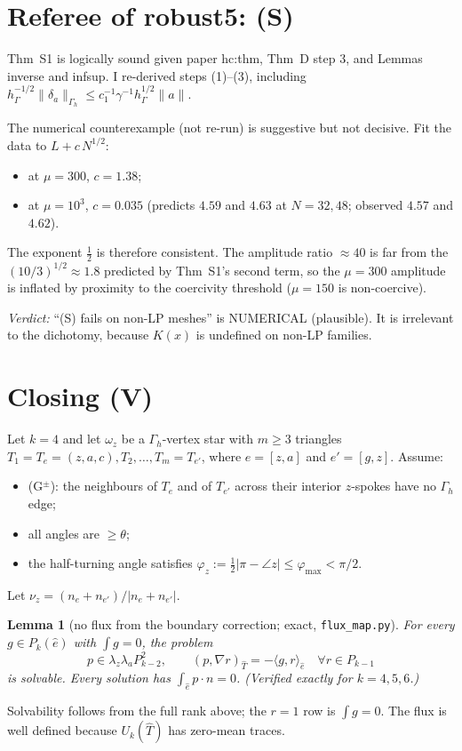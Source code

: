 \documentclass[11pt]{article}
\newtheorem{lemma}[theorem]{Lemma}
\theoremstyle{remark}
\newcommand{\hG}{h_\Gamma}
\newcommand{\Gh}{\Gamma_h}
\newcommand{\ip}[2]{\langle #1,#2\rangle}
\begin{document}
\section{Referee of robust5: (S)}
Thm~S1 is logically sound given paper hc:thm, Thm~D step 3, and Lemmas inverse and infsup. I re-derived steps (1)--(3), including
$\hG^{-1/2}\|\delta_a\|_{\Gh}\le c_1^{-1}\gamma^{-1}\hG^{1/2}\|a\|$.

The numerical counterexample (not re-run) is suggestive but not decisive. Fit the data to $L+c\,N^{1/2}$:
\begin{itemize}
\item at $\mu=300$, $c=1.38$;
\item at $\mu=10^3$, $c=0.035$ (predicts $4.59$ and $4.63$ at $N=32,48$; observed $4.57$ and $4.62$).
\end{itemize}
The exponent $\tfrac12$ is therefore consistent. The amplitude ratio $\approx40$ is far from the $(10/3)^{1/2}\approx1.8$ predicted by Thm~S1's second term,
so the $\mu=300$ amplitude is inflated by proximity to the coercivity threshold ($\mu=150$ is non-coercive).

\emph{Verdict:} ``(S) fails on non-LP meshes'' is NUMERICAL (plausible). It is irrelevant to the dichotomy, because $K(x)$ is undefined on non-LP families.

\section{Closing (V)}
Let $k=4$ and let $\omega_z$ be a $\Gh$-vertex star with $m\ge3$ triangles $T_1=T_e=(z,a,c),T_2,\dots,T_m=T_{e'}$, where $e=[z,a]$ and $e'=[g,z]$.
Assume:
\begin{itemize}
\item (G$^\pm$): the neighbours of $T_e$ and of $T_{e'}$ across their interior $z$-spokes have no $\Gh$ edge;
\item all angles are $\ge\theta$;
\item the half-turning angle satisfies $\varphi_z:=\tfrac12|\pi-\angle z|\le\varphi_{\max}<\pi/2$.
\end{itemize}
Let $\nu_z=(n_e+n_{e'})/|n_e+n_{e'}|$.

\begin{lemma}[no flux from the boundary correction; exact, \texttt{flux\_map.py}]\label{lem:flux0}
For every $g\in P_k(\hat e)$ with $\int g=0$, the problem
\[
p\in\lambda_z\lambda_aP_{k-2}^2,\qquad(p,\nabla r)_{\hat T}=-\ip g r_{\hat e}\quad\forall r\in P_{k-1}
\]
is solvable. Every solution has $\int_{\hat e}p\cdot n=0$. (Verified exactly for $k=4,5,6$.)
\end{lemma}
Solvability follows from the full rank above; the $r=1$ row is $\int g=0$. The flux is well defined because $U_k(\hat T)$ has zero-mean traces.
\end{document}
